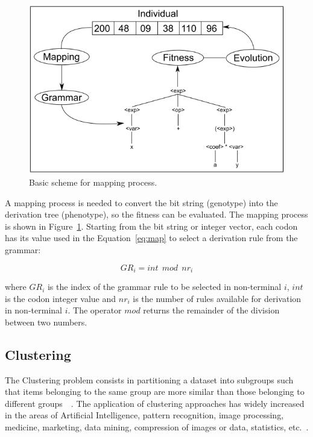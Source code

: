 \documentclass[journal]{IEEEtran}
\begin{document}
	
	
	\begin{figure}[!htb]
		\centering
		\includegraphics[scale=.4]{figures/ge_algo.png}
		\caption{Basic scheme for mapping process.~\cite{cerri2013grammatical}}
		\label{fig:ge_algo}
	\end{figure}
	
	A mapping process is needed to convert the bit string (genotype) into the derivation tree (phenotype), so the fitness can be evaluated. The mapping process is shown in Figure~\ref{fig:ge_algo}. Starting from the bit string or integer vector, each codon has its value used in the Equation~\ref{eq:map} to select a derivation rule from the grammar:
	
	\begin{equation}\label{eq:map}
	GR_i = int~~mod~~nr_i
	\end{equation}
	
	where $GR_i$ is the index of the grammar rule to be selected in non-terminal $i$, $int$ is the codon integer value and $nr_i$ is the number of rules available for derivation in non-terminal $i$. The operator $mod$ returns the remainder of the division between two numbers.
	
	
	\subsection{Clustering}
	
	The Clustering problem consists in partitioning a dataset into subgroups such that items belonging to the same group are more similar than those belonging to different groups~\cite{boric2007genetic}~\cite{ahalya2015data}. The application of clustering approaches has widely increased in the areas of Artificial Intelligence, pattern recognition, image processing, medicine, marketing, data mining, compression of images or data, statistics, etc.~\cite{ahalya2015data}.
	
\end{document}
